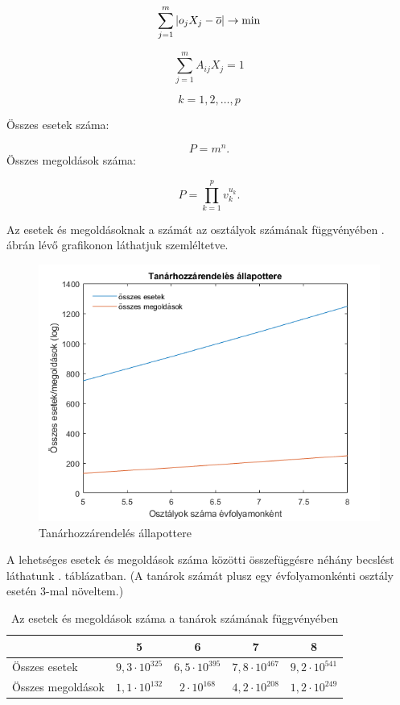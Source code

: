 $$\sum_{j=1}^m \vert o_jX_j-\overline{o}\vert \rightarrow \hbox{min}$$

$$\sum_{j=1}^m A_{ij} X_j=1$$

$$k=1, 2, \ldots, p$$


Összes esetek száma:

$$P=m^n.$$
Összes megoldások száma:

$$P=\prod_{k=1}^p v_k^{u_k}.$$

Az esetek és megoldásoknak a számát az osztályok számának függvényében . ábrán lévő grafikonon láthatjuk szemléltetve.

\begin{figure}[h!]
	\includegraphics[width=\linewidth]{images/tanarhozzarendeles.png}
	\caption{Tanárhozzárendelés állapottere}
	\label{fig:tanarhozzarendeles}
\end{figure}

A lehetséges esetek és megoldások száma közötti összefüggésre néhány becslést láthatunk . táblázatban. (A tanárok számát plusz egy évfolyamonkénti osztály esetén 3-mal növeltem.)

\begin{table}[h!]
	\centering
	\caption{Az esetek és megoldások száma a tanárok számának függvényében}
	\label{tab:complexity}
	\medskip
\begin{tabular}{|l|c|c|c|c|}
\hline
& 5 & 6 & 7 & 8 \\
\hline
Összes esetek & $9,3 \cdot 10^{325}$ & $6,5 \cdot 10^{395}$ & $7,8 \cdot 10^{467}$ & $9,2 \cdot 10^{541}$ \\
\hline 
Összes megoldások & $1,1 \cdot 10^{132}$ & $2 \cdot 10^{168}$ & $4,2 \cdot 10^{208}$ & $1,2 \cdot 10^{249}$ \\
\hline
\end{tabular}
\end{table}

